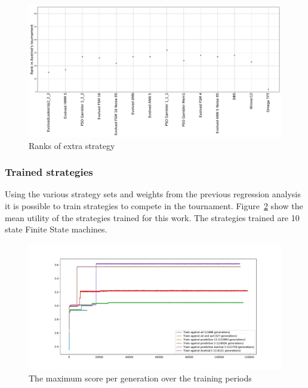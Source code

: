 \documentclass{article}
\begin{document}
\begin{figure}[!hbtp]
    \centering
    \includegraphics[width=.8\textwidth]{assets/original_tournament_with_extra_strategy_ranks_vs_library_ranks.pdf}
    \caption{Ranks of extra strategy}
    \label{fig:original_tournament_with_extra_strategy_ranks_vs_library_ranks}
\end{figure}

\subsubsection{Trained strategies}\label{sec:trained_strategies}

Using the various strategy sets and weights from the previous regression
analysis
it is possible to train strategies to compete in the tournament.
Figure~\ref{fig:training_data_max_score} show the mean utility of the strategies
trained for this work. The strategies trained are 10 state Finite State
machines.

\begin{figure}[!hbtp]
    \centering
    \includegraphics[width=.8\textwidth]{assets/training_data_max_score.pdf}
    \caption{The maximum score per generation over the training periods}
    \label{fig:training_data_max_score}
\end{figure}
\end{document}
